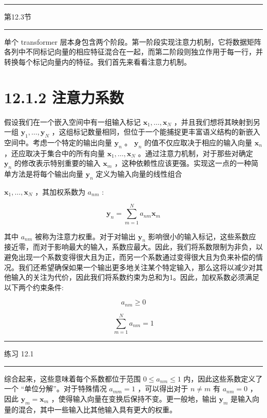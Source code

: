 \documentclass[10pt]{report}
\newcommand{\HRule}{\begin{center}\rule{0.9\linewidth}{0.2mm}\end{center}}
\begin{document}
\HRule

第12.3节

\HRule

单个 transformer 层本身包含两个阶段。第一阶段实现注意力机制，它将数据矩阵各列中不同标记向量的相应特征混合在一起，而第二阶段则独立作用于每一行，并转换每个标记向量内的特征。我们首先来看看注意力机制。

\section*{12.1.2 注意力系数}

假设我们在一个嵌入空间中有一组输入标记 \({\mathbf{x}}_{1},\ldots ,{\mathbf{x}}_{N}\) ，并且我们想将其映射到另一组 \({\mathbf{y}}_{1},\ldots ,{\mathbf{y}}_{N}\) ，这组标记数量相同，但位于一个能捕捉更丰富语义结构的新嵌入空间中。考虑一个特定的输出向量 \({\mathbf{y}}_{n}\) 。 \({\mathbf{y}}_{n}\) 的值不仅应取决于相应的输入向量 \({\mathbf{x}}_{n}\) ，还应取决于集合中的所有向量 \({\mathbf{x}}_{1},\ldots ,{\mathbf{x}}_{N}\) 。通过注意力机制，对于那些对确定 \({\mathbf{y}}_{n}\) 的修改表示特别重要的输入 \({\mathbf{x}}_{m}\) ，这种依赖性应该更强。实现这一点的一种简单方法是将每个输出向量 \({\mathbf{y}}_{n}\) 定义为输入向量的线性组合

\({\mathbf{x}}_{1},\ldots ,{\mathbf{x}}_{N}\) ，其加权系数为 \({a}_{nm}\) :

\[
{\mathbf{y}}_{n} = \mathop{\sum }\limits_{{m = 1}}^{N}{a}_{nm}{\mathbf{x}}_{m} \tag{12.2}
\]

其中 \({a}_{nm}\) 被称为注意力权重。对于对输出 \({\mathbf{y}}_{n}\) 影响很小的输入标记，这些系数应接近零，而对于影响最大的输入，系数应最大。因此，我们将系数限制为非负，以避免出现一个系数变得很大且为正，而另一个系数通过变得很大且为负来补偿的情况。我们还希望确保如果一个输出更多地关注某个特定输入，那么这将以减少对其他输入的关注为代价，因此我们将系数约束为总和为1。因此，加权系数必须满足以下两个约束条件:

\[
{a}_{nm} \geq  0 \tag{12.3}
\]

\[
\mathop{\sum }\limits_{{m = 1}}^{N}{a}_{nm} = 1 \tag{12.4}
\]

\HRule

练习 12.1

\HRule

综合起来，这些意味着每个系数都位于范围 \(0 \leq  {a}_{nm} \leq  1\) 内，因此这些系数定义了一个 “单位分解”。对于特殊情况 \({a}_{mm} = 1\) ，可以得出对于 \(n \neq  m\) 有 \({a}_{nm} = 0\) ，因此 \({\mathbf{y}}_{m} = {\mathbf{x}}_{m}\) ，使得输入向量在变换后保持不变。更一般地，输出 \({\mathbf{y}}_{m}\) 是输入向量的混合，其中一些输入比其他输入具有更大的权重。
\end{document}
